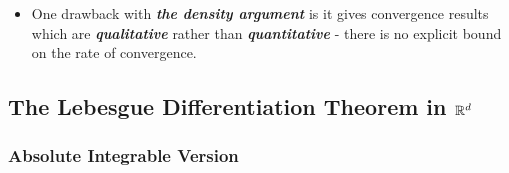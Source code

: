 \documentclass[11pt]{article}
\begin{document}
\begin{itemize}
\item \begin{remark}
One drawback with \emph{\textbf{the density argument}} is it gives convergence results which are \emph{\textbf{qualitative}} rather than \emph{\textbf{quantitative}} - there is no explicit bound on the rate of convergence.
\end{remark}
\end{itemize}


\subsection{The Lebesgue Differentiation Theorem in ${\mathbb R}^{d}$}
\subsubsection{Absolute Integrable Version}
\end{document}
